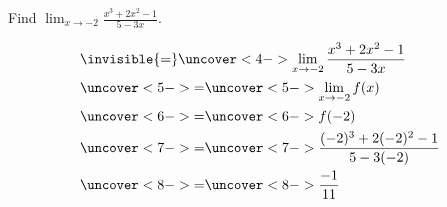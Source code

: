 \begin{frame}
\begin{example}[Example 5, p. 117]
Find $\lim_{x\rightarrow -2}\frac{x^3+2x^2-1}{5-3x}$.

\begin{align*}
& \invisible{=} \uncover<4->{\lim_{x\rightarrow -2} \frac{x^3 + 2x^2 - 1}{5-3x}}\\
& \uncover<5->{ = }  
\uncover<5->{\lim_{x\rightarrow -2}f(x)}\\
& \uncover<6->{ = }  
\uncover<6->{f(-2)}\\
& \uncover<7->{ = }  
\uncover<7->{\frac{(-2)^3 + 2(-2)^2 - 1}{5 - 3(-2)}}\\
& \uncover<8->{ = }  
\uncover<8->{\frac{-1}{11}}
\end{align*}
\end{example}
\end{frame}
